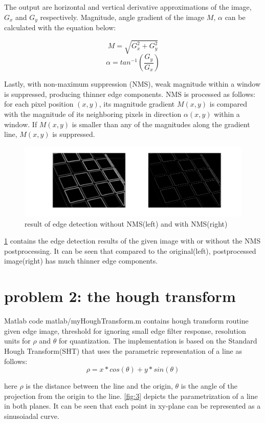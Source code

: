\documentclass[extendedabs]{bmvc2k}
\begin{document}
The output are horizontal and vertical derivative approximations of the image, $G_x$ and $G_y$ respectively. 
Magnitude, angle gradient of the image $M$, $\alpha$ can be calculated with the equation below:

\[M = \sqrt{G_x^2 + G_y^2}\]
\[\alpha = tan^{-1}(\frac{G_y}{G_x})\]

Lastly, with non-maximum suppression (NMS), weak magnitude within a window is suppressed, producing thinner edge components.
NMS is processed as follows: for each pixel position $(x,y)$, its magnitude gradient $M(x,y)$ is compared with the magnitude of
its neighboring pixels in direction $\alpha(x,y)$ within a window. If $M(x,y)$ is smaller than any of the magnitudes along the
gradient line, $M(x,y)$ is suppressed. 

\begin{figure}[h]
    \centering
    \includegraphics[width=\linewidth]{hw4_1_2}
    \caption{result of edge detection without NMS(left) and with NMS(right)}
    \label{fig:2}
\end{figure}

\figurename{\ref{fig:2}} contains the edge detection results of the given image with or without the NMS postprocessing.
It can be seen that compared to the original(left), postprocessed image(right) has much thinner edge components.

\section*{problem 2: the hough transform}

Matlab code matlab/myHoughTransform.m contains hough transform routine given edge image, threshold for ignoring small edge
filter response, resolution units for $\rho$ and $\theta$ for quantization. The implementation is based on the
Standard Hough Transform(SHT) that uses the parametric representation of a line as follows:
\[\rho = x * cos(\theta) + y*sin(\theta)\]

here $\rho$ is the distance between the line and the origin, $\theta$ is the angle of the projection from the origin to the line. 
\figurename{\ref{fig:3}} depicts the parametrization of a line in both planes. It can be seen that each point in xy-plane
can be represented as a sinusoiadal curve.  
\end{document}

